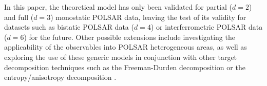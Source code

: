 \documentclass[printer]{tRSL2e}
\begin{document}
In this paper, the theoretical model has only been validated for partial ($d=2$) and full ($d=3$) monostatic POLSAR data,
  leaving the test of its validity for datasets such as bistatic POLSAR data ($d=4$) or interferrometric POLSAR data ($d=6$) for the future.
Other possible extensions include
  investigating the applicability of the observables into POLSAR heterogeneous areas,
  as well as exploring the use of these generic models in conjunction with other target decomposition techniques
    such as the Freeman-Durden decomposition \citep{Freeman_1998_TGRS_963} or the entropy/anisotropy decomposition \citep{Cloude_1997_TGRS_68}.



\end{document}
